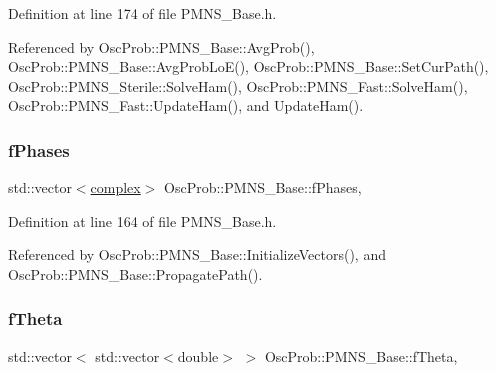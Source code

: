 Definition at line 174 of file P\+M\+N\+S\+\_\+\+Base.\+h.



Referenced by Osc\+Prob\+::\+P\+M\+N\+S\+\_\+\+Base\+::\+Avg\+Prob(), Osc\+Prob\+::\+P\+M\+N\+S\+\_\+\+Base\+::\+Avg\+Prob\+Lo\+E(), Osc\+Prob\+::\+P\+M\+N\+S\+\_\+\+Base\+::\+Set\+Cur\+Path(), Osc\+Prob\+::\+P\+M\+N\+S\+\_\+\+Sterile\+::\+Solve\+Ham(), Osc\+Prob\+::\+P\+M\+N\+S\+\_\+\+Fast\+::\+Solve\+Ham(), Osc\+Prob\+::\+P\+M\+N\+S\+\_\+\+Fast\+::\+Update\+Ham(), and Update\+Ham().

\mbox{\label{classOscProb_1_1PMNS__Base_a2fcb59d7c533e4cd963b1890e504d3dc}} 
\subsubsection{\texorpdfstring{f\+Phases}{fPhases}}
{\footnotesize\ttfamily std\+::vector$<$\hyperlink{classOscProb_1_1PMNS__Base_ae86ec4718808ce9d02e5f5b4226714ab}{complex}$>$ Osc\+Prob\+::\+P\+M\+N\+S\+\_\+\+Base\+::f\+Phases\hspace{0.3cm}{\ttfamily [protected]}, {\ttfamily [inherited]}}



Definition at line 164 of file P\+M\+N\+S\+\_\+\+Base.\+h.



Referenced by Osc\+Prob\+::\+P\+M\+N\+S\+\_\+\+Base\+::\+Initialize\+Vectors(), and Osc\+Prob\+::\+P\+M\+N\+S\+\_\+\+Base\+::\+Propagate\+Path().

\mbox{\label{classOscProb_1_1PMNS__Base_a1976887cd658dd86b2336c181f1470b4}} 
\subsubsection{\texorpdfstring{f\+Theta}{fTheta}}
{\footnotesize\ttfamily std\+::vector$<$ std\+::vector$<$double$>$ $>$ Osc\+Prob\+::\+P\+M\+N\+S\+\_\+\+Base\+::f\+Theta\hspace{0.3cm}{\ttfamily [protected]}, {\ttfamily [inherited]}}



